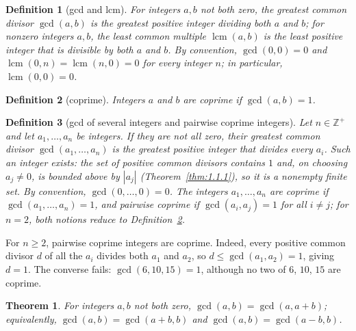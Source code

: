 \documentclass[11pt]{article}
\theoremstyle{ntstyle}
\newtheorem{theorem}{Theorem}[subsection]
\newtheorem{definition}{Definition}[subsection]
\DeclareMathOperator{\lcm}{lcm}
\begin{document}
\begin{definition}[gcd and lcm]\label{def:2.2.1} For integers $a,
		b$ not both zero, the greatest common divisor $\gcd(a, b)$ is the greatest positive integer
		dividing both $a$ and $b$; for nonzero integers $a, b$,
	the least common multiple $\lcm(a, b)$ is the least positive integer that is
	divisible by both $a$ and $b$. By convention, $\gcd(0, 0)=0$ and $\lcm(0, n)=\lcm(n, 0)=0$
	for every integer $n$; in particular, $\lcm(0, 0)=0$.
\end{definition}
\begin{definition}[coprime]\label{def:2.2.2} Integers $a$ and $b$ are
	coprime if $\gcd(a, b) = 1$.
\end{definition}
\begin{definition}[gcd of several integers and pairwise coprime integers]\label{def:2.2.3} Let
	$n\in\mathbb{Z}^+$ and let $a_1, \ldots, a_n$ be integers. If they are not all zero,
	their greatest common divisor $\gcd(a_1, \ldots, a_n)$ is the greatest positive
	integer that divides every $a_i$. Such an integer exists: the set of positive
	common divisors contains $1$ and, on choosing $a_j\neq0$, is bounded above
	by $|a_j|$ (Theorem~\ref{thm:1.1.1}), so it is a nonempty finite set.
	By convention, $\gcd(0, \ldots, 0)=0$. The
	integers $a_1, \ldots, a_n$ are coprime if $\gcd(a_1, \ldots, a_n)=1$, and pairwise
	coprime if $\gcd(a_i, a_j)=1$ for all $i\neq j$; for $n=2$, both notions reduce
	to Definition~\ref{def:2.2.2}.
\end{definition}

For $n\ge2$, pairwise coprime integers are coprime. Indeed, every positive
common divisor $d$ of all the $a_i$ divides both $a_1$ and $a_2$, so
$d\le\gcd(a_1,a_2)=1$, giving $d=1$.
The converse fails: $\gcd(6,10,15)=1$, although no two of $6$, $10$, $15$
are coprime.

\begin{theorem}\label{thm:2.2.1}
	For integers $a, b$ not both zero, $\gcd(a, b) = \gcd(a, a+b)$;
	equivalently, $\gcd(a, b) = \gcd(a+b, b)$ and $\gcd(a, b) = \gcd(a-b, b)$.
\end{theorem}
\end{document}
